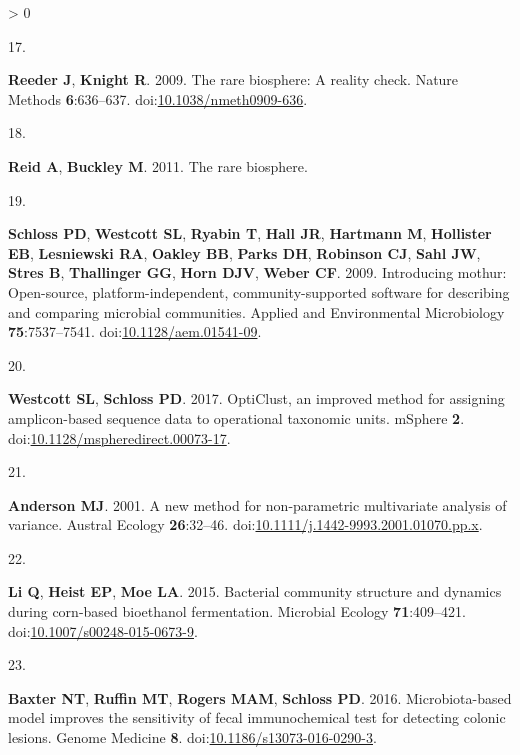 \documentclass[
]{article}
\newlength{\cslhangindent}
\newlength{\csllabelwidth}
\newenvironment{CSLReferences}[3] %
 {%
  \setlength{\parindent}{0pt}
  \ifodd #1 \everypar{\setlength{\hangindent}{\cslhangindent}}\ignorespaces\fi
  \ifnum #2 > 0
  \setlength{\parskip}{#2\baselineskip}
  \fi
 }%
 {}
\newcommand{\CSLLeftMargin}[1]{\parbox[t]{\csllabelwidth}{#1}}
\newcommand{\CSLRightInline}[1]{\parbox[t]{\linewidth - \csllabelwidth}{#1}}
\begin{document}
\begin{CSLReferences}{0}{0}
\leavevmode\hypertarget{ref-Reeder2009}{}%
\CSLLeftMargin{17. }
\CSLRightInline{\textbf{Reeder J}, \textbf{Knight R}. 2009. The {{}}rare
biosphere{{}}: A reality check. Nature Methods \textbf{6}:636--637.
doi:\href{https://doi.org/10.1038/nmeth0909-636}{10.1038/nmeth0909-636}.}

\leavevmode\hypertarget{ref-Reid2011}{}%
\CSLLeftMargin{18. }
\CSLRightInline{\textbf{Reid A}, \textbf{Buckley M}. 2011. The rare
biosphere.}

\leavevmode\hypertarget{ref-Schloss2009}{}%
\CSLLeftMargin{19. }
\CSLRightInline{\textbf{Schloss PD}, \textbf{Westcott SL},
\textbf{Ryabin T}, \textbf{Hall JR}, \textbf{Hartmann M},
\textbf{Hollister EB}, \textbf{Lesniewski RA}, \textbf{Oakley BB},
\textbf{Parks DH}, \textbf{Robinson CJ}, \textbf{Sahl JW}, \textbf{Stres
B}, \textbf{Thallinger GG}, \textbf{Horn DJV}, \textbf{Weber CF}. 2009.
Introducing mothur: Open-source, platform-independent,
community-supported software for describing and comparing microbial
communities. Applied and Environmental Microbiology
\textbf{75}:7537--7541.
doi:\href{https://doi.org/10.1128/aem.01541-09}{10.1128/aem.01541-09}.}

\leavevmode\hypertarget{ref-Westcott2017}{}%
\CSLLeftMargin{20. }
\CSLRightInline{\textbf{Westcott SL}, \textbf{Schloss PD}. 2017.
{OptiClust}, an improved method for assigning amplicon-based sequence
data to operational taxonomic units. {mSphere} \textbf{2}.
doi:\href{https://doi.org/10.1128/mspheredirect.00073-17}{10.1128/mspheredirect.00073-17}.}

\leavevmode\hypertarget{ref-Anderson2001}{}%
\CSLLeftMargin{21. }
\CSLRightInline{\textbf{Anderson MJ}. 2001. A new method for
non-parametric multivariate analysis of variance. Austral Ecology
\textbf{26}:32--46.
doi:\href{https://doi.org/10.1111/j.1442-9993.2001.01070.pp.x}{10.1111/j.1442-9993.2001.01070.pp.x}.}

\leavevmode\hypertarget{ref-Li2015}{}%
\CSLLeftMargin{22. }
\CSLRightInline{\textbf{Li Q}, \textbf{Heist EP}, \textbf{Moe LA}. 2015.
Bacterial community structure and dynamics during corn-based bioethanol
fermentation. Microbial Ecology \textbf{71}:409--421.
doi:\href{https://doi.org/10.1007/s00248-015-0673-9}{10.1007/s00248-015-0673-9}.}

\leavevmode\hypertarget{ref-Baxter2016}{}%
\CSLLeftMargin{23. }
\CSLRightInline{\textbf{Baxter NT}, \textbf{Ruffin MT}, \textbf{Rogers
MAM}, \textbf{Schloss PD}. 2016. Microbiota-based model improves the
sensitivity of fecal immunochemical test for detecting colonic lesions.
Genome Medicine \textbf{8}.
doi:\href{https://doi.org/10.1186/s13073-016-0290-3}{10.1186/s13073-016-0290-3}.}


\end{CSLReferences}
\end{document}
